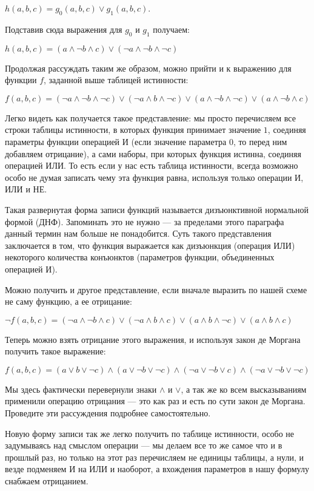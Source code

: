 $h(a, b, c) = g_0(a, b, c) \vee g_1(a, b, c)$.

Подставив сюда выражения для $g_0$ и $g_1$ получаем:

$h(a, b, c) = (a\wedge \neg b \wedge c) \vee (\neg a \wedge \neg b \wedge \neg c)$

Продолжая рассуждать таким же образом, можно прийти и к выражению для функции $f$, заданной выше таблицей истинности:

$f(a, b, c) = (\neg a \wedge \neg b \wedge \neg c) \vee (\neg a \wedge b \wedge \neg c)\vee (a \wedge \neg b \wedge \neg c) \vee (a\wedge \neg b \wedge c) $

Легко видеть как получается такое представление: мы просто перечисляем все строки таблицы истинности, в которых функция принимает значение $1$, соединяя параметры функции операцией И (если значение параметра $0$, то перед ним добавляем отрицание), а сами наборы, при которых функция истинна, соединяя операцией ИЛИ. То есть если у нас есть таблица истинности, всегда возможно особо не думая записать чему эта функция равна, используя только операции И, ИЛИ и НЕ.

Такая развернутая форма записи функций называется дизъюнктивной нормальной формой (ДНФ). Запоминать это не нужно — за пределами этого параграфа данный термин нам больше не понадобится. Суть такого представления заключается в том, что функция выражается как дизъюнкция (операция ИЛИ) некоторого количества конъюнктов (параметров функции, объединенных операцией И).

Можно получить и другое представление, если вначале выразить по нашей схеме не саму функцию, а ее отрицание:

$\neg f(a, b, c) = (\neg a \wedge \neg b \wedge c) \vee (\neg a \wedge b \wedge c) \vee (a\wedge b\wedge \neg c) \vee (a\wedge b \wedge c)$

Теперь можно взять отрицание этого выражения, и используя закон де Моргана получить такое выражение:

$f(a, b, c) = (a \vee b \vee \neg c)\wedge(a\vee \neg b\vee \neg c)\wedge(\neg a\vee \neg b\vee c)\wedge(\neg a\vee\neg b\vee \neg c)$

Мы здесь фактически перевернули знаки $\wedge$ и $\vee$, а так же ко всем высказываниям применили операцию отрицания — это как раз и есть по сути закон де Моргана. Проведите эти рассуждения подробнее самостоятельно.

Новую форму записи так же легко получить по таблице истинности, особо не задумываясь над смыслом операции — мы делаем все то же самое что и в прошлый раз, но только на этот раз перечисляем не единицы таблицы, а нули, и везде подменяем И на ИЛИ и наоборот, а вхождения параметров в нашу формулу снабжаем отрицанием.

